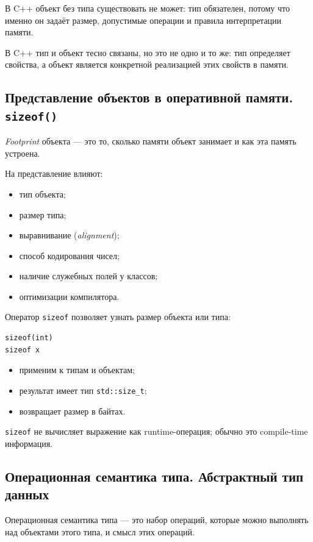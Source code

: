 В C++ объект без типа существовать не может: тип обязателен, потому что именно он задаёт размер, допустимые операции и правила интерпретации памяти.

\begin{remark}
В C++ тип и объект тесно связаны, но это не одно и то же: тип определяет свойства, а объект является конкретной реализацией этих свойств в памяти.
\end{remark}

\subsection{Представление объектов в оперативной памяти. \texttt{sizeof()}}
\begin{definition}[Footprint]
\textit{Footprint} объекта — это то, сколько памяти объект занимает и как эта память устроена.
\end{definition}

На представление влияют:
\begin{itemize}
    \item тип объекта;
    \item размер типа;
    \item выравнивание (\textit{alignment});
    \item способ кодирования чисел;
    \item наличие служебных полей у классов;
    \item оптимизации компилятора.
\end{itemize}

Оператор \texttt{sizeof} позволяет узнать размер объекта или типа:
\begin{verbatim}
sizeof(int)
sizeof x
\end{verbatim}

\begin{itemize}
    \item применим к типам и объектам;
    \item результат имеет тип \texttt{std::size\_t};
    \item возвращает размер в байтах.
\end{itemize}

\begin{remark}
\texttt{sizeof} не вычисляет выражение как runtime-операция; обычно это compile-time информация.
\end{remark}

\subsection{Операционная семантика типа. Абстрактный тип данных}
\begin{definition}
Операционная семантика типа — это набор операций, которые можно выполнять над объектами этого типа, и смысл этих операций.
\end{definition}

